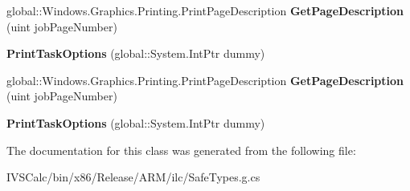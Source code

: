 \begin{DoxyCompactItemize}
global\+::\+Windows.\+Graphics.\+Printing.\+Print\+Page\+Description {\bfseries Get\+Page\+Description} (uint job\+Page\+Number)
\item 
\mbox{\label{class_windows_1_1_graphics_1_1_printing_1_1_print_task_options_a7b2039358cec4b6aa5d9eb767908a6d9}} 
{\bfseries Print\+Task\+Options} (global\+::\+System.\+Int\+Ptr dummy)
\item 
\mbox{\label{class_windows_1_1_graphics_1_1_printing_1_1_print_task_options_a01c2e555d9779be0ac562bd3cc25ee63}} 
global\+::\+Windows.\+Graphics.\+Printing.\+Print\+Page\+Description {\bfseries Get\+Page\+Description} (uint job\+Page\+Number)
\item 
\mbox{\label{class_windows_1_1_graphics_1_1_printing_1_1_print_task_options_a7b2039358cec4b6aa5d9eb767908a6d9}} 
{\bfseries Print\+Task\+Options} (global\+::\+System.\+Int\+Ptr dummy)
\end{DoxyCompactItemize}


The documentation for this class was generated from the following file\+:\begin{DoxyCompactItemize}
\item 
I\+V\+S\+Calc/bin/x86/\+Release/\+A\+R\+M/ilc/Safe\+Types.\+g.\+cs\end{DoxyCompactItemize}
